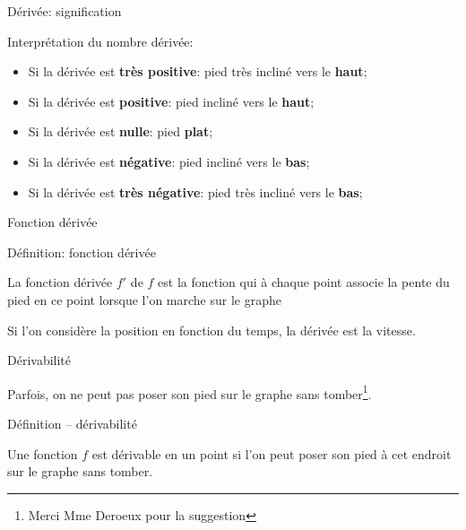 \documentclass{beamer}
\begin{document}
\begin{frame}
    {Dérivée: signification}

    Interprétation du nombre dérivée:
    \begin{itemize}
        \item Si la dérivée est \textbf{très positive}: pied très incliné vers le \textbf{haut};
            \pause{}
        \item Si la dérivée est \textbf{positive}: pied incliné vers le \textbf{haut};
            \pause{}
        \item Si la dérivée est \textbf{nulle}: pied \textbf{plat};
            \pause{}
        \item Si la dérivée est \textbf{négative}: pied incliné vers le \textbf{bas};
            \pause{}
        \item Si la dérivée est \textbf{très négative}: pied très incliné vers le \textbf{bas};
            \pause{}
    \end{itemize}
\end{frame}

\begin{frame}
    {Fonction dérivée}

    \begin{exampleblock}
        {Définition: fonction dérivée}

        La fonction dérivée $f'$ de $f$ est la fonction qui à chaque point
        associe la pente du pied en ce point lorsque l'on marche sur le graphe
    \end{exampleblock}
    \pause{}

    \begin{plot}{0.25}{-10}{-2}{10}{10}
    \end{plot}
    Si l'on considère la position en fonction du temps,
    la dérivée est la vitesse.
\end{frame}

\begin{frame}
    {Dérivabilité}

    Parfois,
    on ne peut pas poser son pied sur le graphe sans tomber\footnote{Merci Mme Deroeux pour la suggestion}.
    \begin{plot}{0.25}{-10}{-1}{10}{10}
    \end{plot}
    \pause{}

    \begin{exampleblock}
        {Définition -- dérivabilité}

        Une fonction $f$ est dérivable en un point si l'on peut poser son pied à cet endroit sur le graphe sans tomber.
    \end{exampleblock}
\end{frame}
\end{document}
